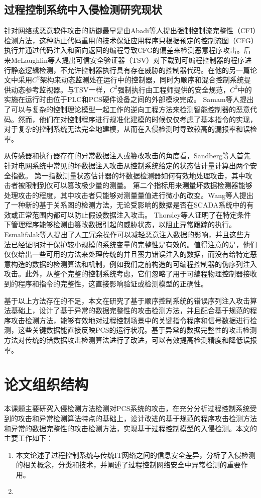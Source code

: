 \subsection{过程控制系统中入侵检测研究现状}

针对网络或恶意软件攻击的防御最早是由Abadi等人提出强制控制流完整性（CFI）检测方法\parencite{Abadi09}，这种防止代码重用的技术保证应用程序只根据预定的控制流图（CFG）执行并通过代码注入和面向返回的编程导致CFG的偏差来检测恶意程序攻击。后来McLaughlin等人提出可信安全验证器（TSV）\parencite {TSV2014}对下载到可编程控制器的程序进行静态逻辑检测，不允许控制器执行具有存在威胁的控制器代码。在他的另一篇论文中采用$C^2$架构\parencite{McLaughlin13}来动态监测处在运行中的控制器，同时为顺序和混合控制系统提供动态参考监视器。与TSV一样，$C^2$强制执行由工程师提供的安全规范，$C^2$中的实施在运行时由位于PLC和PCS硬件设备之间的外部模块完成。 Samam等人提出了可以与复杂的控制理论模型一起工作的逆向工程方法来检测智能控制器的恶意代码\parencite{Zonouz2014}。然而，他们在对控制程序进行规准化建模的时候仅仅考虑了基本指令的实现，对于复杂的控制系统无法完全地建模，从而在入侵检测时导致较高的漏报率和误检率。

从传感器和执行器存在的异常数据注入或篡改攻击的角度看，Sandberg等人首先针对电网系统中常见的坏数据注入攻击从控制系统给定的状态估计量计算出两个安全指数。 第一指数测量状态估计器的坏数据检测器如何有效地处理攻击，其中攻击者被限制到仅可以篡改极少量的测量\parencite{Sandberg10}。 第二个指标用来测量坏数据检测器能够处理攻击的程度，其中攻击者只能够对测量量值进行微小的改变。Wang等人提出了一种新的基于关系图的检测方法，无论受影响的数据是否在SCADA系统中的有效或正常范围内都可以防止假设数据注入攻击\parencite {wang2014}。 Thorsley等人证明了在特定条件下管理程序能够检测由篡改数据引起的威胁状态，以阻止异常跟踪的执行\parencite {Thorsley2014}。 Esmalifalak等人提出了人工冗余操作可以减轻恶意注入数据的影响，并且这些方法已经证明对于保护较小规模的系统变量的完整性是有效的\parencite{liu2014}。值得注意的是，他们仅仅给出一些可用的方法来处理传统的并且蛮力错误注入的数据，而没有给特定恶意构造的数据的检测算法和机制，例如我们之前构造的可编程控制器的伪序列注入攻击。此外，从整个完整的控制系统考虑，它们忽略了用于可编程物理控制器接收到的程序和指令的完整性，这直接影响验证或检测模型的正确性。

基于以上方法存在的不足，本文在研究了基于顺序控制系统的错误序列注入攻击算法基础上，设计了基于异常的数据完整性的攻击检测方法，并且配合基于规范的程序攻击检测方法，能够有效地对过程控制场景中的关键指令程序和信号数据进行检测，这些关键数据能直接反映PCS的运行状况。基于异常的数据完整性的攻击检测方法对传统的错数据攻击检测算法进行了改进，可以有效提高检测精度和降低误报率。

\section{论文组织结构}

本课题主要研究入侵检测方法检测对PCS系统的攻击，在充分分析过程控制系统受到的攻击和异常检测算法特点的基础上，设计改进的基于规范的程序攻击检测方法和异常的数据完整性的攻击检测方法，实现基于过程控制模型的入侵检测。本文的主要工作如下：
\begin{enumerate}
	\item 本文论述了过程控制系统与传统IT网络之间的信息安全差异，分析了入侵检测的相关概念，分类和技术，并阐述了过程控制网络安全中异常检测的重要作用。
	\item 
\end{enumerate}
